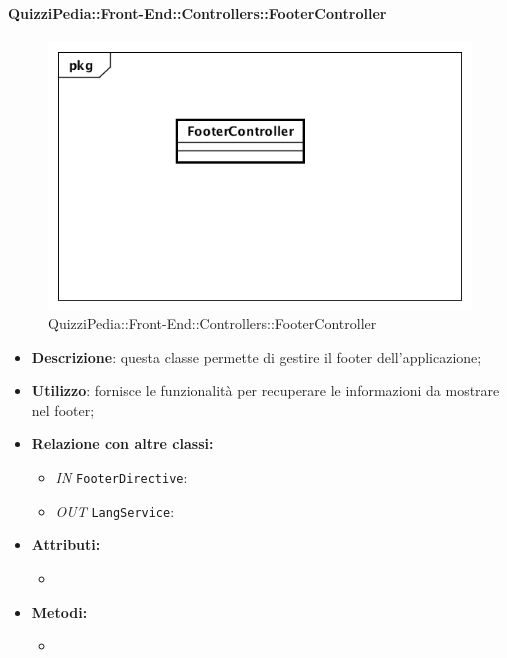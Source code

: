 \paragraph{QuizziPedia::Front-End::Controllers::FooterController}
\begin{figure}
	\centering
	\includegraphics[scale=0.45]{UML/Classi/Front-End/QuizziPedia_Front-end_Controller_FooterController.png}
	\caption{QuizziPedia::Front-End::Controllers::FooterController}
\end{figure}
\begin{itemize}
	\item \textbf{Descrizione}: questa classe permette di gestire il footer dell'applicazione;
	\item \textbf{Utilizzo}: fornisce le funzionalità per recuperare le informazioni da mostrare nel footer;
	\item \textbf{Relazione con altre classi:}
	\begin{itemize}
		\item \textit{IN} \texttt{FooterDirective}:  
		\item \textit{OUT} \texttt{LangService}: 
	\end{itemize}
	\item \textbf{Attributi:}
	\begin{itemize}
		\item 
	\end{itemize}
	\item \textbf{Metodi:}
	\begin{itemize}
		\item 
	\end{itemize}
\end{itemize}

